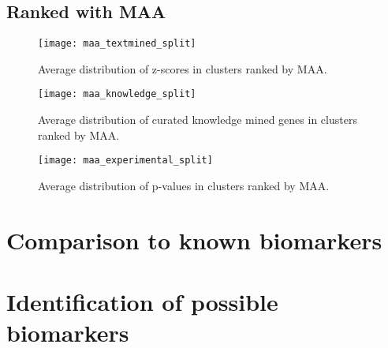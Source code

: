 \subsection{Ranked with MAA}
\begin{figure}
    \label{fig:txt-iref-maa}
    \texttt{[image: maa\_textmined\_split]}
    \caption{Average distribution of z-scores in clusters ranked by MAA.}
\end{figure}
\begin{figure}
    \label{fig:know-iref-maa}
    \texttt{[image: maa\_knowledge\_split]}
    \caption{Average distribution of curated knowledge mined genes in clusters
    ranked by MAA.}
\end{figure}
\begin{figure}
    \label{fig:exp-iref-maa}
    \texttt{[image: maa\_experimental\_split]}
    \caption{Average distribution of p-values in clusters ranked by MAA.}
\end{figure}

\section{Comparison to known biomarkers}
\section{Identification of possible biomarkers}
